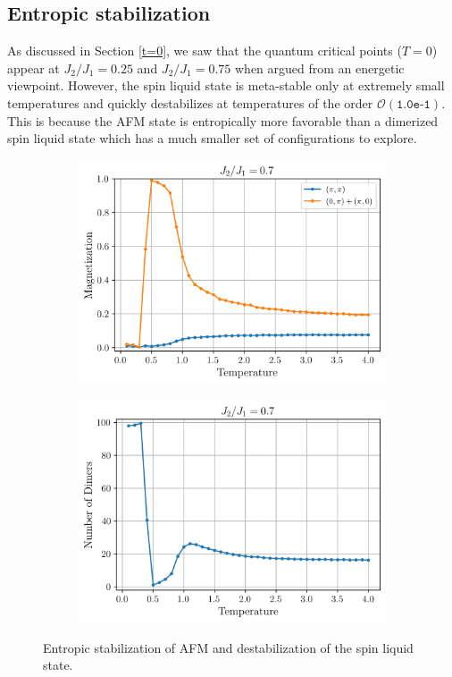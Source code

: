 \documentclass[../thesis_main.tex]{subfiles}
\begin{document}
\subsection{Entropic stabilization}
As discussed in Section \ref{t=0}, we saw that the quantum critical points ($T=0$) appear at $J_2/J_1 = 0.25$ and $J_2/J_1 = 0.75$ when argued from an energetic viewpoint. However, the spin liquid state is meta-stable only at extremely small temperatures and quickly destabilizes at temperatures of the order $\mathcal{O}(\texttt{1.0e-1})$. This is because the AFM state is entropically more favorable than a dimerized spin liquid state which has a much smaller set of configurations to explore. 
\begin{figure}[!htb]
    \centering
    \begin{subfigure}[b]{0.45\textwidth}  %
        \centering
        \includegraphics[width=\textwidth]{images/j1-j2/entropy_mag.png}
    \end{subfigure}
    \begin{subfigure}[b]{0.45\textwidth}
        \centering
        \includegraphics[width=\textwidth]{images/j1-j2/entropy_ndimer.png}
    \end{subfigure}
    \caption{Entropic stabilization of AFM and destabilization of the spin liquid state.}
    \label{}
\end{figure}
\end{document}
